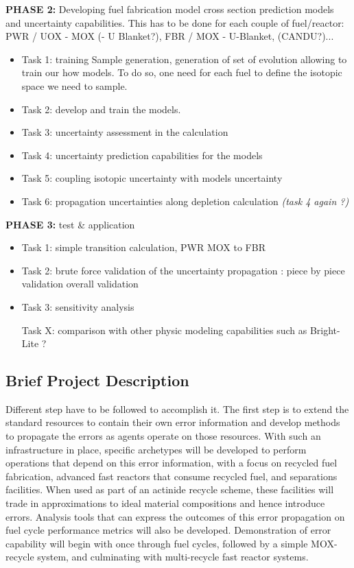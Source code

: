 \documentclass[dvips,12pt]{article}
\begin{document}
\noindent\textbf{PHASE 2:} Developing fuel fabrication model cross section prediction models and uncertainty capabilities. This has to be done for each couple of fuel/reactor: PWR / UOX - MOX (- U Blanket?), FBR / MOX - U-Blanket, (CANDU?)...
\begin{itemize}
\item Task 1: training Sample generation, generation of set of evolution allowing to train our how models.
To do so, one need for each fuel to define the isotopic space we need to sample. 
\item Task 2: develop and train the models.
\item Task 3: uncertainty assessment in the calculation
\item Task 4: uncertainty prediction capabilities for the models
\item Task 5: coupling isotopic uncertainty with models uncertainty
\item Task 6: propagation uncertainties along depletion calculation \textit{(task 4 again ?)}
\end{itemize}
 
\noindent\textbf{PHASE 3:} test \& application
\begin{itemize}
\item Task 1: simple transition calculation, PWR MOX to FBR
\item Task 2: brute force validation of the uncertainty propagation :
piece by piece validation
overall validation
\item Task 3: sensitivity analysis

Task X: comparison with other physic modeling capabilities such as Bright-Lite ?
\end{itemize}


\pagebreak
\pagebreak




\subsection{Brief Project Description}
Different step have to be followed to accomplish it.
The first step is to extend the standard resources to contain their own error information and develop methods to propagate the errors as agents operate on those resources. With such an infrastructure in place, specific archetypes will be developed to perform operations that depend on this error information, with a focus on recycled fuel fabrication, advanced fast reactors that consume recycled fuel, and separations facilities. 
When used as part of an actinide recycle scheme, these facilities will trade in approximations to ideal material compositions and hence introduce errors. 
Analysis tools that can express the outcomes of this error propagation on fuel cycle performance metrics will also be developed. Demonstration of error capability will begin with once through fuel cycles, followed by a simple MOX-recycle system, and culminating with multi-recycle fast reactor systems.
\end{document}
